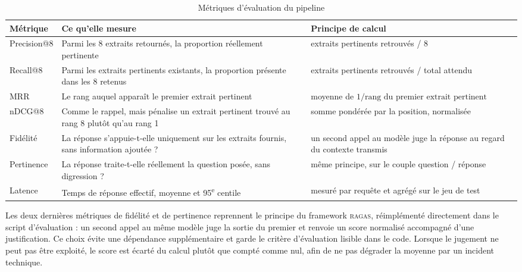 \begin{table}[h]
\centering
\caption{Métriques d'évaluation du pipeline}
\label{tab:metriques}
\begin{tabular}{|p{3.3cm}|p{5.6cm}|p{4.7cm}|}
\hline
\textbf{Métrique} & \textbf{Ce qu'elle mesure} & \textbf{Principe de calcul} \\
\hline
Precision@8 & Parmi les 8 extraits retournés, la proportion réellement
pertinente & extraits pertinents retrouvés / 8 \\
\hline
Recall@8 & Parmi les extraits pertinents existants, la proportion présente
dans les 8 retenus & extraits pertinents retrouvés / total attendu \\
\hline
MRR & Le rang auquel apparaît le premier extrait pertinent & moyenne de
$1/\text{rang du premier extrait pertinent}$ \\
\hline
nDCG@8 & Comme le rappel, mais pénalise un extrait pertinent trouvé au rang 8
plutôt qu'au rang 1 & somme pondérée par la position, normalisée \\
\hline
Fidélité & La réponse s'appuie-t-elle uniquement sur les extraits fournis,
sans information ajoutée ? & un second appel au modèle juge la réponse au
regard du contexte transmis \\
\hline
Pertinence & La réponse traite-t-elle réellement la question posée, sans
digression ? & même principe, sur le couple question / réponse \\
\hline
Latence & Temps de réponse effectif, moyenne et 95\textsuperscript{e}
centile & mesuré par requête et agrégé sur le jeu de test \\
\hline
\end{tabular}
\end{table}

Les deux dernières métriques de fidélité et de pertinence reprennent le principe
du framework \textsc{ragas}, réimplémenté directement dans le script
d'évaluation : un second appel au même modèle juge la sortie du premier et
renvoie un score normalisé accompagné d'une justification. Ce choix évite une
dépendance supplémentaire et garde le critère d'évaluation lisible dans le code.
Lorsque le jugement ne peut pas être exploité, le score est écarté du calcul
plutôt que compté comme nul, afin de ne pas dégrader la moyenne par un incident
technique.

